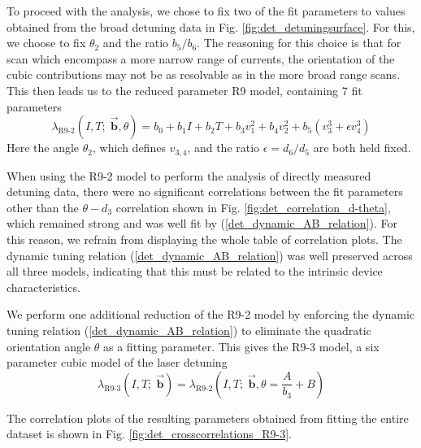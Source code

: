 \documentclass[8pt,a4paper]{report}
\begin{document}
	To proceed with the analysis, we chose to fix two of the fit parameters to values obtained from the broad detuning data in Fig. \ref{fig:det_detuningsurface}. For this, we choose to fix $\theta_2$ and the ratio $b_5 / b_6$. The reasoning for this choice is that for scan which encompass a more narrow range of currents, the orientation of the cubic contributions may not be as resolvable as in the more broad range scans. This then leads us to the reduced parameter R9 model, containing 7 fit parameters
	\begin{equation}
		\lambda_\mathrm{R9\text{-}2}(I, T;\; \vec{\textbf{b}},\theta) = b_0 + b_1 I + b_2 T + b_3 v_1^2 + b_4 v_2^2 + b_5( v_3^3 + \epsilon v_4^3 )
	\end{equation}
	Here the angle $\theta_2$, which defines $v_{3,4}$, and the ratio $\epsilon = d_6 / d_5$ are both held fixed.
	
	When using the R9-2 model to perform the analysis of directly measured detuning data, there were no significant correlations between the fit parameters other than the $\theta-d_3$ correlation shown in Fig. \ref{fig:det_correlation_d-theta}, which remained strong and was well fit by (\ref{det_dynamic_AB_relation}). For this reason, we refrain from displaying the whole table of correlation plots. The dynamic tuning relation (\ref{det_dynamic_AB_relation}) was well preserved across all three models, indicating that this must be related to the intrinsic device characteristics.
	
	We perform one additional reduction of the R9-2 model by enforcing the dynamic tuning relation (\ref{det_dynamic_AB_relation}) to eliminate the quadratic orientation angle $\theta$ as a fitting parameter. This gives the R9-3 model, a six parameter cubic model of the laser detuning
	\begin{equation}
		\lambda_\mathrm{R9\text{-}3}(I, T;\; \vec{\textbf{b}}) = \lambda_\mathrm{R9\text{-}2}\left(I, T;\; \vec{\textbf{b}},\theta = \frac{A}{b_3} + B\right)
	\end{equation}
	
	The correlation plots of the resulting parameters obtained from fitting the entire dataset is shown in Fig. \ref{fig:det_crosscorrelations_R9-3}.
	
	
\end{document}
